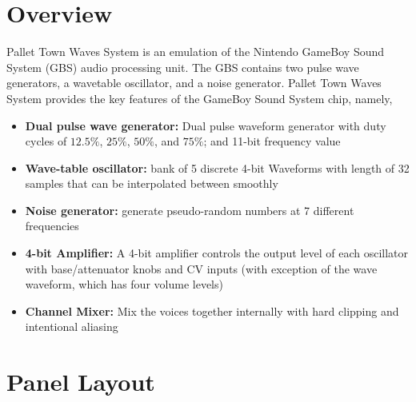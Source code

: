 \documentclass[12pt,letter]{article}
\begin{document}


\section*{Overview}

Pallet Town Waves System is an emulation of the Nintendo GameBoy Sound System (GBS) audio processing unit. The GBS contains two pulse wave generators, a wavetable oscillator, and a noise generator. Pallet Town Waves System provides the key features of the GameBoy Sound System chip, namely,
\begin{itemize}
  \item \textbf{Dual pulse wave generator:} Dual pulse waveform generator with duty cycles of $12.5\%$, $25\%$, $50\%$, and $75\%$; and 11-bit frequency value
  \item \textbf{Wave-table oscillator:} bank of 5 discrete 4-bit Waveforms with length of 32 samples that can be interpolated between smoothly
  \item \textbf{Noise generator:} generate pseudo-random numbers at 7 different frequencies
  \item \textbf{4-bit Amplifier:} A 4-bit amplifier controls the output level of each oscillator with base/attenuator knobs and CV inputs (with exception of the wave waveform, which has four volume levels)
  \item \textbf{Channel Mixer:} Mix the voices together internally with hard clipping and intentional aliasing
\end{itemize}


\clearpage
\section*{Panel Layout}
\end{document}
